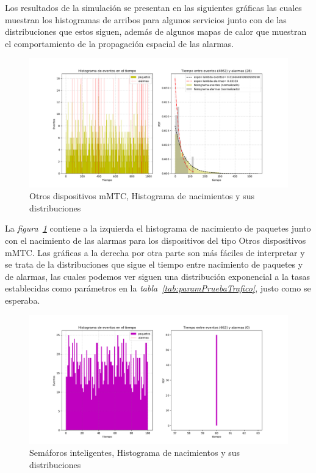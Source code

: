 Los resultados de la simulación se presentan en las siguientes gráficas las cuales muestran los histogramas de arribos para algunos servicios junto con de las distribuciones que estos siguen, además de algunos mapas de calor que muestran el comportamiento de la propagación espacial de las alarmas. \newline

\begin{figure}[th]
    \centering
    \includegraphics[scale=.55]{Figures/Otros_dispositivos_mMTC.png}
    \decoRule
    \caption[Otros dispositivos mMTC, Histograma de nacimientos y sus distribuciones]{Otros dispositivos mMTC, Histograma de nacimientos y sus distribuciones}
    \label{fig:histoeventos1}
\end{figure}

La \textit{figura~\ref{fig:histoeventos1}} contiene a la izquierda el histograma de  nacimiento de paquetes junto con el nacimiento de las alarmas para los dispositivos  del tipo Otros dispositivos mMTC. Las gráficas a la derecha por otra parte son más fáciles de interpretar y se trata de la distribuciones que sigue el tiempo entre nacimiento de paquetes y de alarmas, las cuales podemos ver  siguen una distribución exponencial a la tasas establecidas como parámetros en la  \textit{tabla~\ref{tab:paramPruebaTrafico}}, justo como se esperaba.\newline

\begin{figure}[th]
    \centering
    \includegraphics[scale=.55]{Figures/Semaforos_inteligentes.png}
    \decoRule
    \caption[Semáforos inteligentes, Histograma de nacimientos y sus distribuciones]{Semáforos inteligentes, Histograma de nacimientos y sus distribuciones}
    \label{fig:histoeventos2}
\end{figure}

